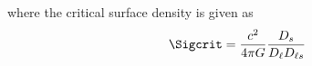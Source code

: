 where the critical surface density is given as
\begin{equation}
\Sigcrit = \frac{c^2}{4 \pi G} \frac{D_s}{D_\ell D_{\ell s}}
\end{equation}
  